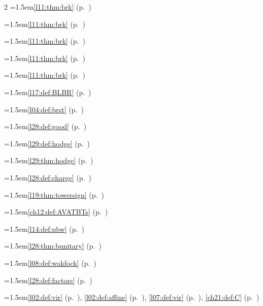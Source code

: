 \begin{multicols}{2}
\hangindent=1.5em\quad \ref{l11:thm:brk} (p.~\pageref{l11:thm:brk})\par
\hangindent=1.5em\quad \ref{l11:thm:brk} (p.~\pageref{l11:thm:brk})\par
\hangindent=1.5em\quad \ref{l11:thm:brk} (p.~\pageref{l11:thm:brk})\par
\hangindent=1.5em\quad \ref{l11:thm:brk} (p.~\pageref{l11:thm:brk})\par
\hangindent=1.5em\quad \ref{l11:thm:brk} (p.~\pageref{l11:thm:brk})\par
\hangindent=1.5em\quad \ref{l17:def:BLBR} (p.~\pageref{l17:def:BLBR})\par
\hangindent=1.5em\quad \ref{l04:def:brst} (p.~\pageref{l04:def:brst})\par
\hangindent=1.5em\quad \ref{l28:def:good} (p.~\pageref{l28:def:good})\par
\hangindent=1.5em\quad \ref{l29:def:hodge} (p.~\pageref{l29:def:hodge})\par
\hangindent=1.5em\quad \ref{l29:thm:hodge} (p.~\pageref{l29:thm:hodge})\par
\hangindent=1.5em\quad \ref{l28:def:charge} (p.~\pageref{l28:def:charge})\par
\hangindent=1.5em\quad \ref{l19:thm:towersign} (p.~\pageref{l19:thm:towersign})\par
\hangindent=1.5em\quad \ref{ch12:def:AVATBTs} (p.~\pageref{ch12:def:AVATBTs})\par
\hangindent=1.5em\quad \ref{l14:def:pbw} (p.~\pageref{l14:def:pbw})\par
\hangindent=1.5em\quad \ref{l28:thm:bunitary} (p.~\pageref{l28:thm:bunitary})\par
\hangindent=1.5em\quad \ref{l08:def:wakfock} (p.~\pageref{l08:def:wakfock})\par
\hangindent=1.5em\quad \ref{l28:def:factors} (p.~\pageref{l28:def:factors})\par
\par{}\par\nopagebreak\smallskip
\hangindent=1.5em\quad \ref{l02:def:vir} (p.~\pageref{l02:def:vir}), \ref{l02:def:affine} (p.~\pageref{l02:def:affine}), \ref{l07:def:vir} (p.~\pageref{l07:def:vir}), \ref{ch21:def:C} (p.~\pageref{ch21:def:C})\par

\end{multicols}
